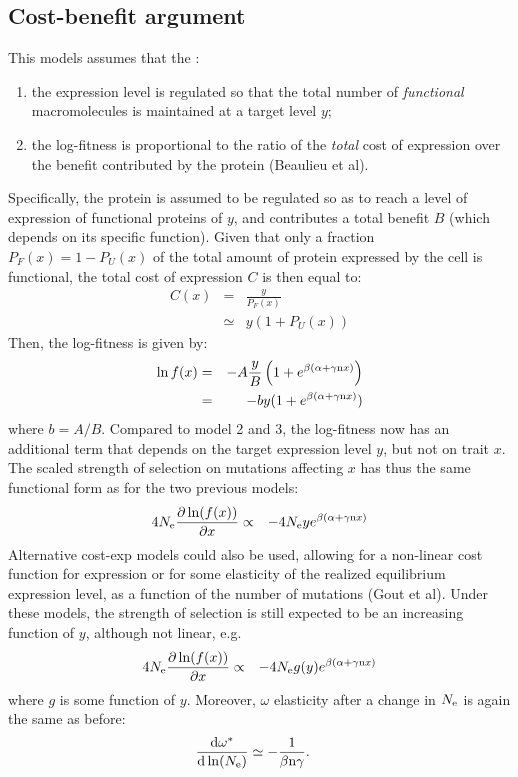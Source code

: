 \documentclass{article}
\begin{document}
\subsection{Cost-benefit argument}
This models assumes that the :
\begin{enumerate}
 \item the expression level is regulated so that the total number of \emph{functional} macromolecules is maintained at a target level $y$;
 \item the log-fitness is proportional to the ratio of the \emph{total} cost of expression over the benefit contributed by the protein (Beaulieu et al).
\end{enumerate}
Specifically, the protein is assumed to be regulated so as to reach a level of expression of functional proteins of $y$, and contributes a total benefit $B$ (which depends on its specific function). Given that only a fraction $P_{F}(x) = 1-P_{U}(x)$ of the total amount of protein expressed by the cell is functional, the total cost of expression $C$ is then equal to:
\begin{eqnarray}
C(x) &=& \frac{y}{P_{F}(x)}
\\ &\simeq& y (1 + P_{U}(x))
\end{eqnarray}
Then, the log-fitness is given by:
\begin{eqnarray}
\ln f (x) & = & -A \frac{y}{B} \left( 1 + e^{\beta(\alpha + \gamma\text{n} x)} \right)
\\
&=& -by (1 + e^{\beta(\alpha + \gamma\text{n} x)})
\end{eqnarray}
where $b = A /B$. Compared to model 2 and 3, the log-fitness now has an additional term that depends on the target expression level $y$, but not on trait $x$. The scaled strength of selection on mutations affecting $x$ has thus the same functional form as for the two previous models:
\begin{eqnarray}
4 N_{\mathrm{e}} \frac{\partial \ln (f(x))}{\partial x} &\propto& -4 N_{\mathrm{e}} y e^{\beta(\alpha + \gamma\text{n} x)}
\end{eqnarray}
Alternative cost-exp models could also be used, allowing for a non-linear cost function for expression or for some elasticity of the realized equilibrium expression level, as a function of the number of mutations (Gout et al). Under these models, the strength of selection is still expected to be an increasing function of $y$, although not linear, e.g.
\begin{eqnarray}
4 N_{\mathrm{e}} \frac{\partial \ln (f(x))}{\partial x} &\propto& -4 N_{\mathrm{e}} g(y) e^{\beta(\alpha + \gamma\text{n} x)}
\end{eqnarray}
where $g$ is some function of $y$.
Moreover, $\omega$ elasticity after a change in $N_{\mathrm{e}}$ is again the same as before:
\begin{align}
\frac{ \mathrm{d} \omega^{*}}{\mathrm{d} \ln (N_{\mathrm{e}})} & \simeq - \frac{1}{\beta \text{n} \gamma}.
\end{align}
\end{document}
